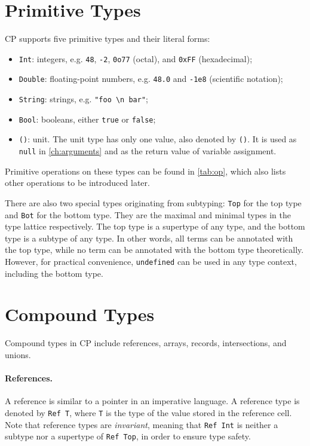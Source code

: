 \section{Primitive Types}

CP supports five primitive types and their literal forms: 
\begin{itemize}
\item \lstinline{Int}: integers, e.g. \lstinline{48}, \lstinline{-2}, \lstinline{0o77} (octal), and \lstinline{0xFF} (hexadecimal);
\item \lstinline{Double}: floating-point numbers, e.g. \lstinline{48.0} and \lstinline{-1e8} (scientific notation);
\item \lstinline{String}: strings, e.g. \lstinline{"foo \n bar"};
\item \lstinline{Bool}: booleans, either \lstinline{true} or \lstinline{false};
\item \lstinline{()}: unit. The unit type has only one value, also denoted by
      \lstinline{()}. It is used as \lstinline{null} in \autoref{ch:arguments}
      and as the return value of variable assignment.
\end{itemize}
Primitive operations on these types can be found in \autoref{tab:op}, which also
lists other operations to be introduced later.

There are also two special types originating from subtyping: \lstinline{Top} for
the top type and \lstinline{Bot} for the bottom type. They are the maximal and
minimal types in the type lattice respectively. The top type is a supertype of
any type, and the bottom type is a subtype of any type. In other words, all
terms can be annotated with the top type, while no term can be annotated with
the bottom type theoretically. However, for practical convenience,
\lstinline{undefined} can be used in any type context, including the bottom
type.

\section{Compound Types}

Compound types in CP include references, arrays, records, intersections, and
unions.

\paragraph{References.}
A reference is similar to a pointer in an imperative language. A reference type
is denoted by \lstinline{Ref T}, where \lstinline{T} is the type of the value
stored in the reference cell. Note that reference types are \emph{invariant},
meaning that \lstinline{Ref Int} is neither a subtype nor a supertype of
\lstinline{Ref Top}, in order to ensure type safety.

